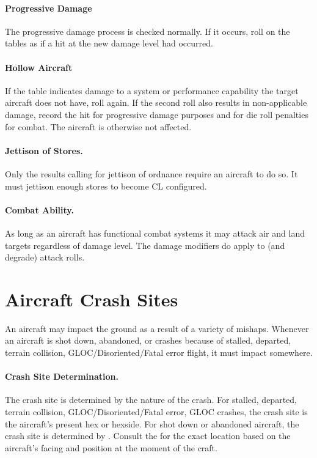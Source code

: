 \begin{advancedrules}
\paragraph{Progressive Damage} The progressive damage process is checked normally. If it occurs, roll on the tables as if a hit at the new damage level had occurred.

\paragraph{Hollow Aircraft} If the table indicates damage to a system or performance capability the target aircraft does not have, roll again. If the second roll also results in non-applicable damage, record the hit for progressive damage purposes and for die roll penalties for combat. The aircraft is otherwise not affected.

\paragraph{Jettison of Stores.} Only the results calling for jettison of ordnance require an aircraft to do so. It must jettison enough stores to become CL configured.

\paragraph{Combat Ability.} As long as an aircraft has functional combat systems it may attack air and land targets regardless of damage level. The damage modifiers do apply to (and degrade) attack rolls.


\section{Aircraft Crash Sites}


An aircraft may impact the ground as a result of a variety of mishaps. Whenever an aircraft is shot down, abandoned, or crashes because of stalled, departed, terrain collision, GLOC/Disoriented/Fatal error flight, it must impact somewhere.

\paragraph{Crash Site Determination.} The crash site is determined by the nature of the crash. For stalled, departed, terrain collision, GLOC/Disoriented/Fatal error, GLOC crashes, the crash site is the aircraft's present hex or hexside. For shot down or abandoned aircraft, the crash site is determined by . Consult the  for the exact location based on the aircraft's facing and position at the moment of the craft.


\end{advancedrules}
